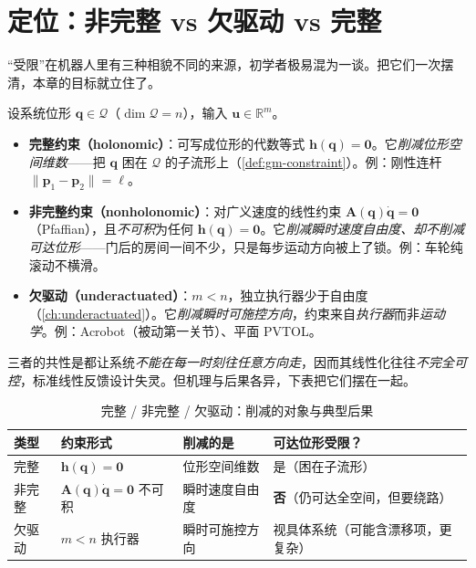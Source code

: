 \section{定位：非完整 vs 欠驱动 vs 完整}
\label{sec:nh-place}

“受限”在机器人里有三种相貌不同的来源，初学者极易混为一谈。把它们一次摆清，本章的目标就立住了。

\begin{definition}[三类“受限”的辨析]\label{def:nh-taxonomy}
设系统位形 $\mathbf{q}\in\mathcal{Q}$（$\dim\mathcal{Q}=n$），输入 $\mathbf{u}\in\mathbb{R}^m$。
\begin{itemize}
  \item \textbf{完整约束（holonomic）}：可写成位形的代数等式 $\mathbf{h}(\mathbf{q})=\mathbf{0}$。它\emph{削减位形空间维数}——把 $\mathbf{q}$ 困在 $\mathcal{Q}$ 的子流形上（\cref{def:gm-constraint}）。例：刚性连杆 $\lVert\mathbf{p}_1-\mathbf{p}_2\rVert=\ell$。
  \item \textbf{非完整约束（nonholonomic）}：对广义速度的线性约束 $\mathbf{A}(\mathbf{q})\dot{\mathbf{q}}=\mathbf{0}$（Pfaffian），且\emph{不可积}为任何 $\mathbf{h}(\mathbf{q})=\mathbf{0}$。它\emph{削减瞬时速度自由度、却不削减可达位形}——门后的房间一间不少，只是每步运动方向被上了锁。例：车轮纯滚动不横滑。
  \item \textbf{欠驱动（underactuated）}：$m<n$，独立执行器少于自由度（\cref{ch:underactuated}）。它\emph{削减瞬时可施控方向}，约束来自\emph{执行器}而非\emph{运动学}。例：Acrobot（被动第一关节）、平面 PVTOL。
\end{itemize}
\end{definition}

三者的共性是都让系统\emph{不能在每一时刻往任意方向走}，因而其线性化往往\emph{不完全可控}，标准线性反馈设计失灵。但机理与后果各异，下表把它们摆在一起。

\begin{table}[H]\centering\small
\caption{完整 / 非完整 / 欠驱动：削减的对象与典型后果}
\label{tab:nh-taxonomy}
\begin{tabular}{llll}
\toprule
类型 & 约束形式 & 削减的是 & 可达位形受限？ \\
\midrule
完整 & $\mathbf{h}(\mathbf{q})=\mathbf{0}$ & 位形空间维数 & 是（困在子流形） \\
非完整 & $\mathbf{A}(\mathbf{q})\dot{\mathbf{q}}=\mathbf{0}$ 不可积 & 瞬时速度自由度 & \textbf{否}（仍可达全空间，但要绕路） \\
欠驱动 & $m<n$ 执行器 & 瞬时可施控方向 & 视具体系统（可能含漂移项，更复杂） \\
\bottomrule
\end{tabular}
\end{table}

